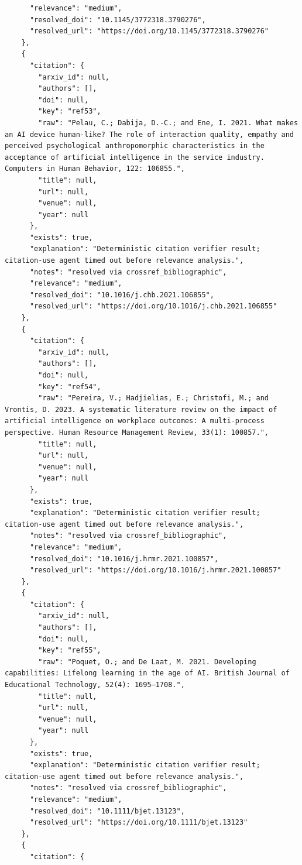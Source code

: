\documentclass[11pt]{article}
\begin{document}
\begin{verbatim}
      "relevance": "medium",
      "resolved_doi": "10.1145/3772318.3790276",
      "resolved_url": "https://doi.org/10.1145/3772318.3790276"
    },
    {
      "citation": {
        "arxiv_id": null,
        "authors": [],
        "doi": null,
        "key": "ref53",
        "raw": "Pelau, C.; Dabija, D.-C.; and Ene, I. 2021. What makes an AI device human-like? The role of interaction quality, empathy and perceived psychological anthropomorphic characteristics in the acceptance of artificial intelligence in the service industry. Computers in Human Behavior, 122: 106855.",
        "title": null,
        "url": null,
        "venue": null,
        "year": null
      },
      "exists": true,
      "explanation": "Deterministic citation verifier result; citation-use agent timed out before relevance analysis.",
      "notes": "resolved via crossref_bibliographic",
      "relevance": "medium",
      "resolved_doi": "10.1016/j.chb.2021.106855",
      "resolved_url": "https://doi.org/10.1016/j.chb.2021.106855"
    },
    {
      "citation": {
        "arxiv_id": null,
        "authors": [],
        "doi": null,
        "key": "ref54",
        "raw": "Pereira, V.; Hadjielias, E.; Christofi, M.; and Vrontis, D. 2023. A systematic literature review on the impact of artificial intelligence on workplace outcomes: A multi-process perspective. Human Resource Management Review, 33(1): 100857.",
        "title": null,
        "url": null,
        "venue": null,
        "year": null
      },
      "exists": true,
      "explanation": "Deterministic citation verifier result; citation-use agent timed out before relevance analysis.",
      "notes": "resolved via crossref_bibliographic",
      "relevance": "medium",
      "resolved_doi": "10.1016/j.hrmr.2021.100857",
      "resolved_url": "https://doi.org/10.1016/j.hrmr.2021.100857"
    },
    {
      "citation": {
        "arxiv_id": null,
        "authors": [],
        "doi": null,
        "key": "ref55",
        "raw": "Poquet, O.; and De Laat, M. 2021. Developing capabilities: Lifelong learning in the age of AI. British Journal of Educational Technology, 52(4): 1695–1708.",
        "title": null,
        "url": null,
        "venue": null,
        "year": null
      },
      "exists": true,
      "explanation": "Deterministic citation verifier result; citation-use agent timed out before relevance analysis.",
      "notes": "resolved via crossref_bibliographic",
      "relevance": "medium",
      "resolved_doi": "10.1111/bjet.13123",
      "resolved_url": "https://doi.org/10.1111/bjet.13123"
    },
    {
      "citation": {

\end{verbatim}
\end{document}
